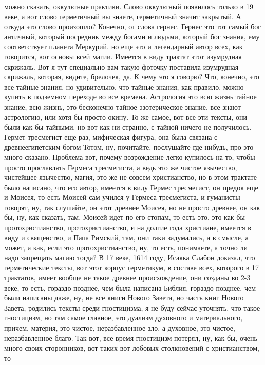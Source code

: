 можно сказать, оккультные практики. Слово оккультный появилось только в 19 веке,
а вот слово герметичный вы знаете, герметичный значит закрытый. А откуда это
слово произошло? Конечно, от слова гернес. Гернес это тот самый бог античный,
который посредник между богами и людьми, который бог знания, ему соответствует
планета Меркурий. но еще это и легендарный автор всех, как говорится, вот основы
всей магии. Имеется в виду трактат этот изумрудная скрижаль. Вот я тут
специально вам такую фоточку поставила изумрудная скрижаль, которая, видите,
брелочек, да. К чему это я говорю? Что, конечно, это все тайные знания, но
удивительно, что тайные знания, как правило, можно купить в подземном переходе
во все времена. Астрология это всю жизнь тайное знание, всю жизнь, это
бесконечно тайное эзотерическое знание, все знают астрологию, или хотя бы просто
окину. То же самое, вот все эти тексты, они были как бы тайными, но вот как ни
странно, с тайной ничего не получилось. Гермет тресмегист еще раз, мифическая
фигура, она была связана с древнеегипетским богом Тотом, ну, почитайте,
послушайте где-нибудь, про это много сказано. Проблема вот, почему возрождение
легко купилось на то, чтобы просто прославлять Гермеса тресмегиста, а ведь это
же чистое язычество, чистейшее язычество, магия, это же не совсем христианство,
но в этом трактате было написано, что его автор, имеется в виду Гермес
тресмегист, он предок еще и Моисея, то есть Моисей сам учился у Гермеса
тресмегиста, и гуманисты говорят, ну, так слушайте, он этот древнее Моисея, но
не просто древнее, он как бы, ну, как сказать, там, Моисей идет по его стопам,
то есть это, это как бы протохристианство, протохристианство, и на долгие года
христиане, имеется в виду и священство, и Папа Римский, там, они таки
задумались, а в смысле, а может, а как, если это протохристианство, ну, то есть,
понимаете, а точно ли надо запрещать магию тогда? В 17 веке, 1614 году, Исакка
Слабон доказал, что герметические тексты, вот этот корпус герметикум, в составе
всех, которого в 17 трактатов, имеет вообще не такое древнее происхождение, они
созданы во 2-3 веке, то есть, гораздо позднее, чем была написана Библия, гораздо
позднее, чем были написаны даже, ну, не все книги Нового Завета, но часть книг
Нового Завета, родились тексты среди гностицизма, я не буду сейчас уточнять, что
такое гностицизм, но там самое главное, это дуализм духовного и материального,
причем, материя, это чистое, неразбавленное зло, а духовное, это чистое,
неразбавленное благо. Так вот, все время гностицизм потерял, ну, как бы, очень
много своих сторонников, вот таких вот лобовых столкновений с христианством, то
